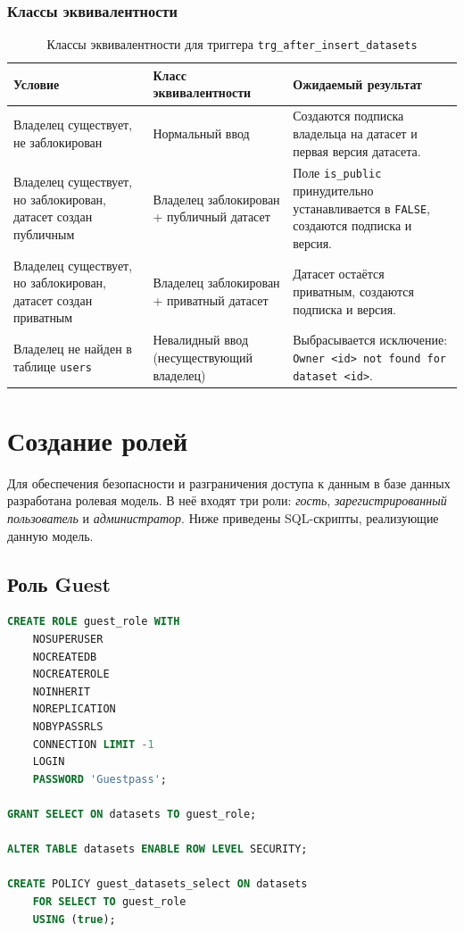 \subsubsection*{Классы эквивалентности}

\begin{table}[H]
\centering
\caption{Классы эквивалентности для триггера \texttt{trg\_after\_insert\_datasets}}
\label{tab:trigger_eq_classes}
\begin{tabular}{|p{5cm}|p{4cm}|p{6cm}|}
\hline
\textbf{Условие} & \textbf{Класс эквивалентности} & \textbf{Ожидаемый результат} \\
\hline
Владелец существует, не заблокирован &
Нормальный ввод  &
Создаются подписка владельца на датасет и первая версия датасета.
\\
\hline
Владелец существует, но заблокирован, датасет создан публичным &
Владелец заблокирован + публичный датасет &
Поле \texttt{is\_public} принудительно устанавливается в \texttt{FALSE}, создаются подписка и версия. \\
\hline
Владелец существует, но заблокирован, датасет создан приватным &
Владелец заблокирован + приватный датасет &
Датасет остаётся приватным, создаются подписка и версия. \\
\hline
Владелец не найден в таблице \texttt{users} &
Невалидный ввод (несуществующий владелец) &
Выбрасывается исключение: \texttt{Owner <id> not found for dataset <id>}. \\
\hline
\end{tabular}
\end{table}

\section{Создание ролей}

Для обеспечения безопасности и разграничения доступа к данным
в базе данных разработана ролевая модель.
В неё входят три роли: \textit{гость}, \textit{зарегистрированный пользователь} и \textit{администратор}.
Ниже приведены SQL-скрипты, реализующие данную модель.

\subsection*{Роль Guest}

\begin{lstlisting}[language=SQL,caption={Создание роли Guest}]
CREATE ROLE guest_role WITH
    NOSUPERUSER
    NOCREATEDB
    NOCREATEROLE
    NOINHERIT
    NOREPLICATION
    NOBYPASSRLS
    CONNECTION LIMIT -1
    LOGIN
    PASSWORD 'Guestpass';

GRANT SELECT ON datasets TO guest_role;

ALTER TABLE datasets ENABLE ROW LEVEL SECURITY;

CREATE POLICY guest_datasets_select ON datasets
    FOR SELECT TO guest_role
    USING (true);
\end{lstlisting}


